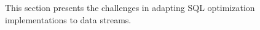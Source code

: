 \label {sec:fs-optimization-challenges}
This section presents the challenges in adapting SQL optimization implementations to data streams.